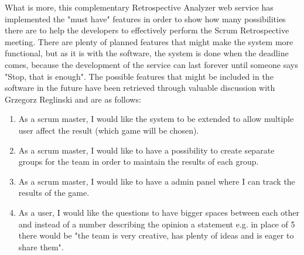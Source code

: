 What is more, this complementary Retrospective Analyzer web service has implemented the "must have" features in order to show how many possibilities there are to help the developers to effectively perform the Scrum Retrospective meeting. There are plenty of planned features that might make the system more functional, but as it is with the software, the system is done when the deadline comes, because the development of the service can last forever until someone says "Stop, that is enough". The possible features that might be included in the software in the future have been retrieved through valuable discussion with Grzegorz Reglinski and are as follows:
\begin{enumerate}
    \item As a scrum master, I would like the system to be extended to allow multiple user affect the result (which game will be chosen).
    \item As a scrum master, I would like to have a possibility to create separate groups for the team in order to maintain the results of each group.
    \item As a scrum master, I would like to have a admin panel where I can track the results of the game.
    \item As a user, I would like the questions to have bigger spaces between each other and instead of a number describing the opinion a statement e.g. in place of 5 there would be "the team is very creative, has plenty of ideas and is eager to share them".
\end{enumerate}



